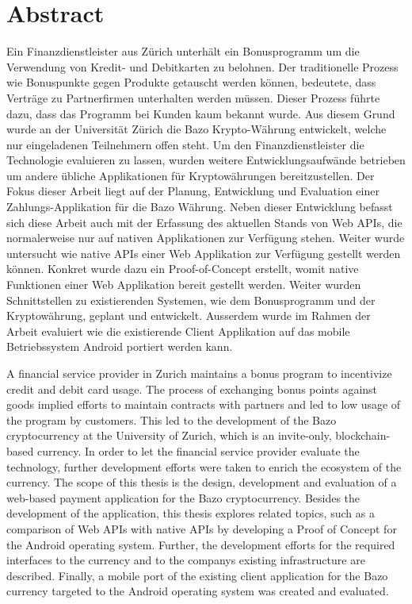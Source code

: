 \chapter*{Abstract}

Ein Finanzdienstleister aus Zürich unterhält ein Bonusprogramm um die Verwendung von Kredit- und Debitkarten zu belohnen. Der traditionelle Prozess wie Bonuspunkte gegen Produkte getauscht werden können, bedeutete, dass Verträge zu Partnerfirmen unterhalten werden müssen. Dieser Prozess führte dazu, dass das Programm bei Kunden kaum bekannt wurde. Aus diesem Grund wurde an der Universität Zürich die Bazo Krypto-Währung entwickelt, welche nur eingeladenen Teilnehmern offen steht. Um den Finanzdienstleister die Technologie evaluieren zu lassen, wurden weitere Entwicklungsaufwände betrieben um andere übliche Applikationen für Kryptowährungen bereitzustellen. Der Fokus dieser Arbeit liegt auf der Planung, Entwicklung und Evaluation einer Zahlungs-Applikation für die Bazo Währung. Neben dieser Entwicklung befasst sich diese Arbeit auch mit der Erfassung des aktuellen Stands von Web APIs, die normalerweise nur auf nativen Applikationen zur Verfügung stehen. Weiter wurde untersucht wie native APIs einer Web Applikation zur Verfügung gestellt werden können. Konkret wurde dazu ein Proof-of-Concept erstellt, womit native Funktionen einer Web Applikation bereit gestellt werden. Weiter wurden Schnittstellen zu existierenden Systemen, wie dem Bonusprogramm und der Kryptowährung, geplant und entwickelt. Ausserdem wurde im Rahmen der Arbeit evaluiert wie die existierende Client Applikation auf das mobile Betriebssystem Android portiert werden kann.

A financial service provider in Zurich maintains a bonus program to incentivize credit and debit card usage. The process of exchanging bonus points against goods implied efforts to maintain contracts with partners and led to low usage of the program by customers. This led to the development of the Bazo cryptocurrency at the University of Zurich, which is an invite-only, blockchain-based currency. In order to let the financial service provider evaluate the technology, further development efforts were taken to enrich the ecosystem of the currency. The scope of this thesis is the design, development and evaluation of a web-based payment application for the Bazo cryptocurrency. Besides the development of the application, this thesis explores related topics, such as a comparison of Web APIs with native APIs by developing a Proof of Concept for the Android operating system. Further, the development efforts for the required interfaces to the currency and to the companys existing infrastructure are described. Finally, a mobile port of the existing client application for the Bazo currency targeted to the Android operating system was created and evaluated.

